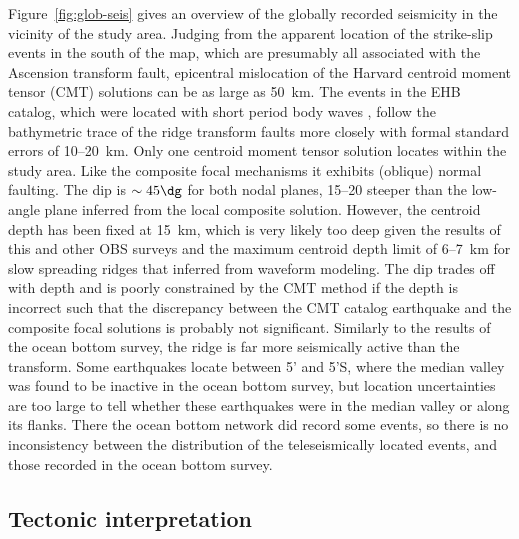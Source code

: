 \documentclass[jgr]{agu2001}
\renewcommand{\remark}[1]{}
\newlength{\tw}
\begin{document}
\begin{article}
Figure~\ref{fig:glob-seis} gives an overview of the globally recorded
seismicity in the vicinity of the study area. Judging from the
apparent location of the strike-slip events in the south of the map,
which are presumably all associated with the Ascension transform
fault, epicentral mislocation of the Harvard centroid moment tensor (CMT) solutions
\citep{dziewonski81a} can be as large as 50~km. The events 
in the EHB catalog, which were located with short period body waves
\citep{engdahl98}, follow the bathymetric trace of the ridge  transform
faults more closely with formal standard errors of 10--20~km.  Only
one centroid moment tensor solution locates within the study
area. Like the composite focal mechanisms it exhibits (oblique) normal
faulting. The dip is $\sim 45\dg$ for both nodal planes,
15--20{\dg} steeper than the low-angle plane inferred from the local
composite solution. However, the centroid depth has been fixed at  15~km,
which is very likely too deep given the results of this and other OBS
surveys and  the maximum centroid depth limit
of 6--7~km for slow spreading ridges that \citet{huang88} inferred  from waveform modeling. 
The dip trades off with depth and is poorly constrained by the CMT
method if the depth is incorrect
\citep{dziewonski81a}
such that
the discrepancy between the CMT catalog earthquake and the composite focal
solutions is probably not significant. Similarly to the results of the
ocean bottom survey, the ridge is far more seismically active than the
transform.  Some earthquakes locate between 5' and 5'S,
where the median valley  was found to be inactive in the ocean bottom
survey, but location uncertainties are too large to tell whether these
earthquakes were in the median valley or along its flanks. There the
ocean bottom network did record some events, so there is no
inconsistency between the distribution of the teleseismically located
events, and those recorded in the ocean bottom
survey.

\subsection{Tectonic interpretation}


\end{article}
\end{document}
